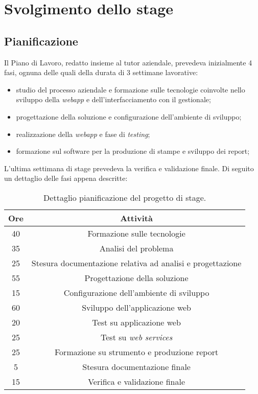 
\chapter{Svolgimento dello stage}
\label{cap:svolgimento-dello-stage}


\section{Pianificazione}

Il Piano di Lavoro, redatto insieme al tutor aziendale, prevedeva inizialmente 4 fasi, ognuna delle quali della durata di 3 settimane lavorative:
\begin{itemize}
	\item studio del processo aziendale e formazione sulle tecnologie coinvolte nello sviluppo della \textit{webapp} e dell'interfacciamento con il gestionale;
	\item progettazione della soluzione e configurazione dell'ambiente di sviluppo;
	\item realizzazione della \textit{webapp} e fase di \textit{testing};
	\item formazione sul software per la produzione di stampe e sviluppo dei report;
\end{itemize}
L'ultima settimana di stage prevedeva la verifica e validazione finale.
Di seguito un dettaglio delle fasi appena descritte:

\begin{center}
	\begin{longtable}{|c|c|}
		\caption{Dettaglio pianificazione del progetto di stage.}\\		
		\hline
		\textbf{Ore} & \textbf{Attività}\\
		\hline
		40 & Formazione sulle tecnologie\\
		\hline
		35 & Analisi del problema\\
		\hline
		25 & Stesura documentazione relativa ad analisi e progettazione\\
		\hline
		55 & Progettazione della soluzione\\
		\hline
		15 & Configurazione dell'ambiente di sviluppo\\
		\hline
		60 & Sviluppo dell'applicazione web\\
		\hline
		20 & Test su applicazione web\\
		\hline
		25 & Test su \textit{web services}\\
		\hline
		25 & Formazione su strumento e produzione report\\
		\hline
		5 & Stesura documentazione finale\\
		\hline
		15 & Verifica e validazione finale\\
		\hline
	\end{longtable}
\end{center}


